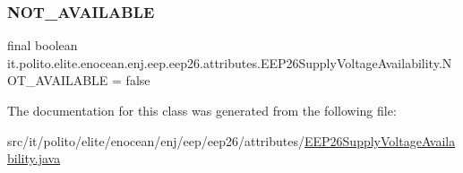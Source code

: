 \subsubsection{\texorpdfstring{N\+O\+T\+\_\+\+A\+V\+A\+I\+L\+A\+B\+LE}{NOT\_AVAILABLE}}
{\footnotesize\ttfamily final boolean it.\+polito.\+elite.\+enocean.\+enj.\+eep.\+eep26.\+attributes.\+E\+E\+P26\+Supply\+Voltage\+Availability.\+N\+O\+T\+\_\+\+A\+V\+A\+I\+L\+A\+B\+LE = false\hspace{0.3cm}{\ttfamily [static]}}



The documentation for this class was generated from the following file\+:\begin{DoxyCompactItemize}
\item 
src/it/polito/elite/enocean/enj/eep/eep26/attributes/\hyperlink{_e_e_p26_supply_voltage_availability_8java}{E\+E\+P26\+Supply\+Voltage\+Availability.\+java}\end{DoxyCompactItemize}
